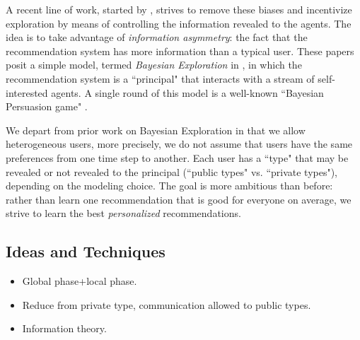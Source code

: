 A recent line of work, started by \cite{Kremer-JPE14}, strives to remove these biases and incentivize exploration by means of controlling the information revealed to the agents. The idea is to take advantage of \emph{information asymmetry}: the fact that the recommendation system has more information than a typical user. These papers posit a simple model, termed \emph{Bayesian Exploration} in \cite{ICexplorationGames-ec16}, in which the recommendation system is a ``principal" that interacts with a stream of self-interested agents. A single round of this model is a well-known ``Bayesian Persuasion game" \cite{Kamenica-aer11}.

We depart from prior work on Bayesian Exploration in that we allow heterogeneous users, more precisely, we do not assume that users have the same preferences from one time step to another. Each user has a ``type" that may be revealed or not revealed to the principal (``public types" vs. ``private types"), depending on the modeling choice. The goal is more ambitious than before: rather than learn one recommendation that is good for everyone on average, we strive to learn the best \emph{personalized} recommendations. 


\subsection{Ideas and Techniques}
\begin{itemize}
\item Global phase+local phase.
\item Reduce from private type, communication allowed to public types.
\item Information theory.
\end{itemize}

